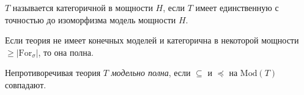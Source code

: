 \begin{definition}
    $T$ называется категоричной в мощности $H$, если $T$ имеет единственную с точностью до изоморфизма модель мощности $H$.
\end{definition}

\begin{theorem}
    Если теория не имеет конечных моделей и категорична в некоторой мощности $\geq |\text{For}_\sigma|$, то она полна.
\end{theorem}

\begin{definition}
    Непротиворечивая теория $T$ \emph{модельно полна}, если $\subseteq$ и $\preceq$ на $\text{Mod}(T)$ совпадают.
\end{definition}
